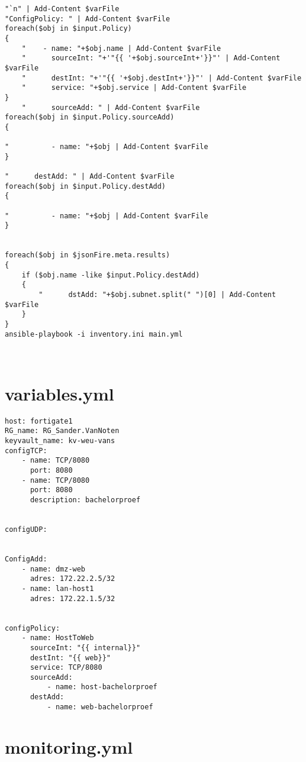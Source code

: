 \documentclass[dutch,dit,thesis]{hogentreport}
\begin{document}
\begin{lstlisting}[caption={main.ps1 Powershell script}]
"`n" | Add-Content $varFile
"ConfigPolicy: " | Add-Content $varFile
foreach($obj in $input.Policy)
{
    "    - name: "+$obj.name | Add-Content $varFile
    "      sourceInt: "+'"{{ '+$obj.sourceInt+'}}"' | Add-Content $varFile
    "      destInt: "+'"{{ '+$obj.destInt+'}}"' | Add-Content $varFile
    "      service: "+$obj.service | Add-Content $varFile
}
    "      sourceAdd: " | Add-Content $varFile
foreach($obj in $input.Policy.sourceAdd)
{

"          - name: "+$obj | Add-Content $varFile
}

"      destAdd: " | Add-Content $varFile
foreach($obj in $input.Policy.destAdd)
{

"          - name: "+$obj | Add-Content $varFile
}


foreach($obj in $jsonFire.meta.results)
{
    if ($obj.name -like $input.Policy.destAdd)
    {
        "      dstAdd: "+$obj.subnet.split(" ")[0] | Add-Content $varFile
    }
}
ansible-playbook -i inventory.ini main.yml

    
\end{lstlisting}

\section{variables.yml}
\label{code:Variables.yml}
\begin{lstlisting}[caption={Variables.yml, dictionaries met elk een eigen doel}]
host: fortigate1
RG_name: RG_Sander.VanNoten
keyvault_name: kv-weu-vans
configTCP: 
    - name: TCP/8080
      port: 8080
    - name: TCP/8080
      port: 8080
      description: bachelorproef


configUDP: 


ConfigAdd: 
    - name: dmz-web
      adres: 172.22.2.5/32
    - name: lan-host1
      adres: 172.22.1.5/32


configPolicy: 
    - name: HostToWeb
      sourceInt: "{{ internal}}"
      destInt: "{{ web}}"
      service: TCP/8080
      sourceAdd: 
          - name: host-bachelorproef
      destAdd: 
          - name: web-bachelorproef

\end{lstlisting}

\section{monitoring.yml}
\label{code:monitoring.yml}
\end{document}
